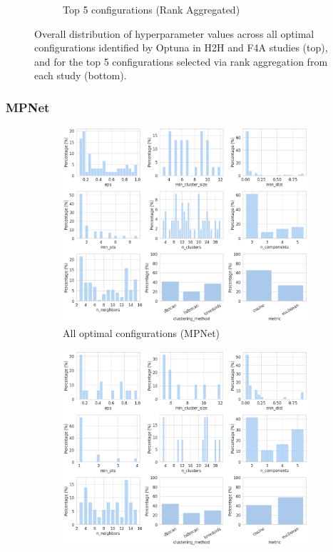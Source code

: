 \documentclass[10pt,oneside]{report}
\begin{document}
\begin{figure}[H]
\begin{subfigure}[b]{0.82\textwidth}
        \caption{Top 5 configurations (Rank Aggregated)}
        \label{fig:overall_param_plot_top5}
    \end{subfigure}
    \caption{Overall distribution of hyperparameter values across all optimal configurations identified by Optuna in H2H and F4A studies (top), and for the top 5 configurations selected via rank aggregation from each study (bottom).}
    \label{fig:overall_param}
\end{figure}

\subsubsection{MPNet}
\begin{figure}[H]
    \centering
    \begin{subfigure}[b]{0.82\textwidth}
        \centering
        \includegraphics[width=\textwidth]{./images/mpnet_param_plot.png}
        \caption{All optimal configurations (MPNet)}
        \label{fig:mpnet_param_plot}
    \end{subfigure}
    \begin{subfigure}[b]{0.82\textwidth}
        \centering
        \includegraphics[width=\textwidth]{./images/mpnet_param_plot_top5.png}

\end{subfigure}
\end{figure}
\end{document}
